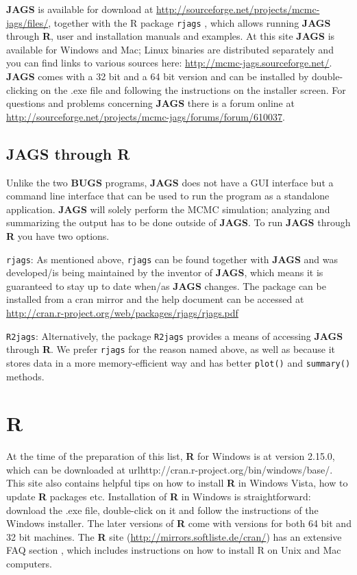 {\bf JAGS} is available for download at \url{http://sourceforge.net/projects/mcmc-jags/files/}, together with the R package \mbox{\tt rjags} \citep{plummer:2011}, which allows running {\bf JAGS} through {\bf R}, user and installation manuals and examples. At this site {\bf JAGS} is available for Windows and Mac; Linux binaries are distributed separately and you can find links to various sources here: \url{http://mcmc-jags.sourceforge.net/}. {\bf JAGS} comes with a 32 bit and a 64 bit version and can be installed by double-clicking on the .exe file and following the instructions on the installer screen. For questions and problems concerning {\bf JAGS} there is a forum online at 
\url{http://sourceforge.net/projects/mcmc-jags/forums/forum/610037}.

\subsection{JAGS through R}
Unlike the two {\bf BUGS} programs, {\bf JAGS} does not have a GUI interface but a command line interface that can be used to run the program as a standalone application. {\bf JAGS} will solely perform the MCMC simulation; analyzing and summarizing the output has to be done outside of {\bf JAGS}. To run {\bf JAGS} through {\bf R} you have two options.
 
{\flushleft \tt rjags}:
 As mentioned above, \mbox{\tt rjags} \citep{plummer:2011} can be found together with {\bf JAGS} and was developed/is being maintained by the inventor of {\bf JAGS}, which means it is guaranteed to stay up to date when/as {\bf JAGS} changes. The package can be installed from a cran mirror and the help document can be accessed at \url{http://cran.r-project.org/web/packages/rjags/rjags.pdf}
 
{\flushleft \tt R2jags}:
 Alternatively, the package \mbox{\tt R2jags} \citep{su_yajima:2011} provides a means of accessing {\bf JAGS} through {\bf R}. We prefer \mbox{\tt rjags} for the reason named above, as well as because it stores data in a more memory-efficient way and has better \mbox{\tt plot()} and \mbox{\tt summary()} methods. 



\section{R}
At the time of the preparation of this list, {\bf R} for Windows is at version 2.15.0, which can be downloaded at url{http://cran.r-project.org/bin/windows/base/}. 
This site also contains helpful tips on how to install {\bf R} in Windows Vista, how to update {\bf R} packages etc. 
Installation of {\bf R} in Windows is straightforward: download the .exe file, double-click on it and follow the instructions of the Windows installer. The later versions of {\bf R} come with versions for both 64 bit and 32 bit machines. 
The {\bf R} site (\url{http://mirrors.softliste.de/cran/}) has an extensive FAQ section \citet{hornik:2011}, which includes instructions on how to install R on Unix and Mac computers.  

